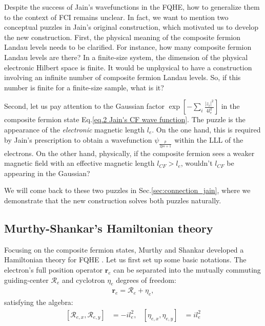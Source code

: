 Despite the success of Jain's wavefunctions in the FQHE, how to generalize them to the context of FCI remains unclear. In fact, we want to mention two conceptual puzzles in Jain's original construction, which motivated us to develop the new construction. First, the physical meaning of the composite fermion Landau levels needs to be clarified. For instance, how many composite fermion Landau levels are there? In a finite-size system, the dimension of the physical electronic Hilbert space is finite. It would be unphysical to have a construction involving an infinite number of composite fermion Landau levels. So, if this number is finite for a finite-size sample, what is it? 

Second, let us pay attention to the Gaussian factor $\exp\left[-\sum_{i}\frac{|z_i|^2}{4l_e^2}\right]$ in the composite fermion state Eq.\eqref{eq.2 Jain's CF wave function}. The puzzle is the appearance of the \emph{electronic} magnetic length $l_e$. On the one hand, this is required by Jain's prescription to obtain a wavefunction $\psi_{\frac{p}{2ps+1}}$ within the LLL of the electrons. On the other hand, physically, if the composite fermion sees a weaker magnetic field with an effective magnetic length $l_{CF}>l_e$, wouldn't $l_{CF}$ be appearing in the Gaussian?

We will come back to these two puzzles in Sec.\ref{sec:connection_jain}, where we demonstrate that the new construction solves both puzzles naturally.

\subsection{Murthy-Shankar's Hamiltonian theory}
Focusing on the composite fermion states, Murthy and Shankar developed a Hamiltonian theory for FQHE \cite{murthy2003hamiltonian}. Let us first set up some basic notations. The electron's full position operator $\bm r_e$ can be separated into the mutually commuting guiding-center $\mathcal R_e$ and cyclotron $\eta_e$ degrees of freedom:
\begin{align}
\bm r_e=\mathcal R_e+\eta_e,
\end{align}
satisfying the algebra:
\begin{align}\label{eq:e_guiding_center}
[\mathcal R_{e,x},\mathcal R_{e,y}]&=-il_e^2,&[\eta_{e,x},\eta_{e,y}]&=il_e^2
\end{align}

